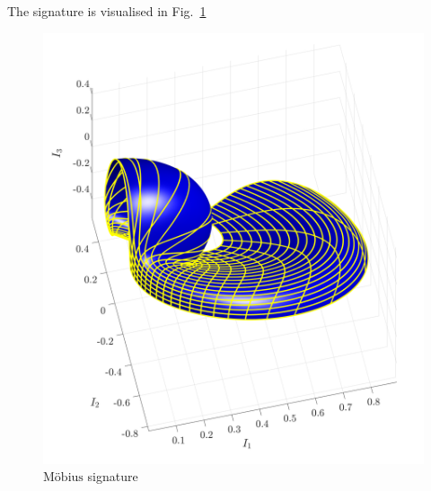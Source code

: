 \documentclass[11pt]{article}
\begin{document}
The signature is visualised in Fig.~\ref{fig:mobiussignature}
\begin{figure}
  \centering
    \includegraphics[width=12cm]{figures/mobius_signature}
    \caption{$\text{M{\"o}bius}$ signature}
  \label{fig:mobiussignature}
\end{figure}
\end{document}
